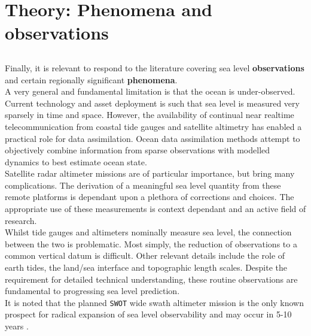 \newpage
\section{Theory: Phenomena and observations}  \label{S:THEORY_OBS} 

 \subsection{}
 
Finally, it is relevant to respond to the literature covering sea level \textbf{observations} and certain regionally significant \textbf{phenomena}.\\
A very general and fundamental limitation is that the ocean is under-observed.  Current technology and asset deployment is such that sea level is measured very sparsely in time and space. However, the availability of continual near realtime telecommunication from coastal tide gauges and satellite altimetry has enabled a practical role for data assimilation.  Ocean data assimilation methods attempt to objectively combine information from sparse observations with modelled dynamics to best estimate ocean state.\\
Satellite radar altimeter missions are of particular importance, but bring many complications.  The derivation of a meaningful sea level quantity from these remote platforms is dependant upon a plethora of corrections and choices.  The appropriate use of these measurements is context dependant and an active field of research.\\
Whilst tide gauges and altimeters nominally measure sea level, the connection between the two is problematic.  Most simply, the reduction of observations to a common vertical datum is difficult.  Other relevant details include the role of earth tides, the land/sea interface and topographic length scales.  Despite the requirement for detailed technical understanding, these routine observations are fundamental to progressing sea level prediction. \\
It is noted that the planned \texttt{SWOT} wide swath altimeter mission is the only known prospect for radical expansion of sea level observability and may occur in 5-10 years \citep{OSTST:2012tg}.\\


